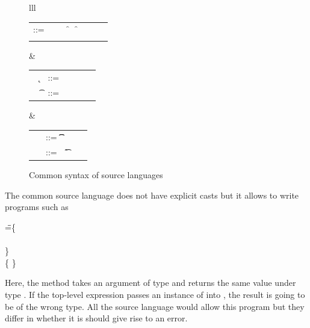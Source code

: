 \documentclass[acmlarge, anonymous, authordraft, review]{acmart} %
\begin{document}
\begin{figure}[!h]\hrulefill
\vspace{2mm}  \small


\begin{tabular}{lll}
\begin{minipage}{7cm}\begin{tabular}{@{}l@{~}l@{}l@{}l@{}l@{}l@{}l@{}l}
\e\hspace{.1cm} ::= & \hspace{.2cm} \x        
    &\B \this         
   &\B \FRead\f     
   &\B \FWrite\f\e   
   &\B \Call\e\m\e \\
   &
   &\B \that      
   &\B \New\C{\e[1]..}  
\end{tabular}\end{minipage}&
\begin{minipage}{4.4cm}\begin{tabular}{l@{~}l@{}l@{}ll}
   ~ \k &::= \Class \C {\fd[1]..}{\md[1]..} \\
~ \t&::= ~ \any  \B   \C  \B \src{\CW}  \\ 
\end{tabular}\end{minipage} &
\begin{minipage}{2.9cm}\begin{tabular}{l@{~}l@{}l@{}l}
\md &::= \Mdef\m\x\t\t\e \\
~\fd&::= ~ \Fdef\f\t \\ 
\end{tabular}\end{minipage}\end{tabular}

\vspace{2mm}\hrulefill
\caption{Common syntax of source languages}\label{f:sourcesyntax}
\end{figure}


The common source language does not have explicit casts but it allows to
write programs such as

\begin{tabbing}
\hspace{1cm}\K\HS \Call{\New\C{}}\m{\New\D{}} \HS\HS\HS\WHERE\HS
  \K\HS =\HS \= \class\= \C \{\\
       \>  \>\Mdef\m\x\any\C{\HS\x\HS}\\
       \> \}  \\
       \>\class \D \{ \}
\end{tabbing}         

\noindent
Here, the method \m takes an argument of type \any and returns the same
value under type \C.  If the top-level expression passes an instance of \D
into \m, the result is going to be of the wrong type. All the source
language would allow this program but they differ in whether it is should
give rise to an error. 
\end{document}
